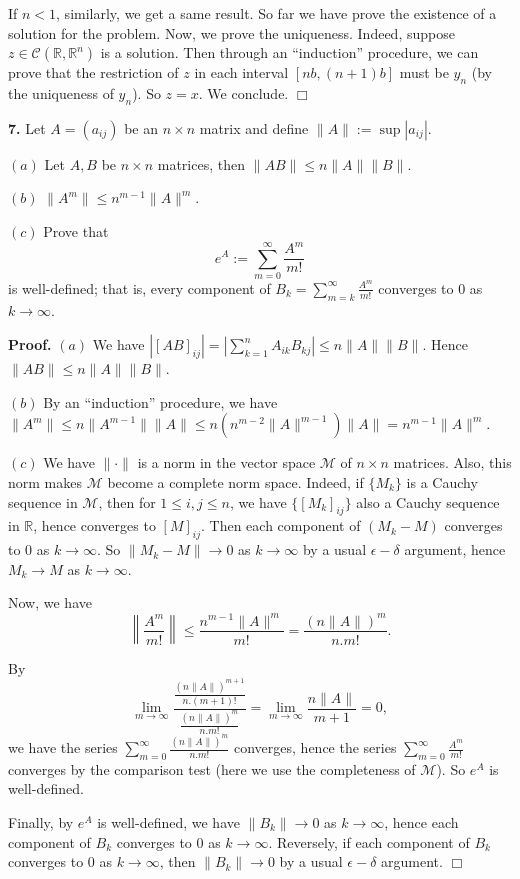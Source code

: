 \documentclass{article}
\begin{document}
If $n < 1$, similarly, we get a same result. So far we have prove the
existence of a solution for the problem. Now, we prove the uniqueness.
Indeed, suppose $z\in \mathcal{C}(\mathbb{R},\mathbb{R}^n)$ is a
solution. Then through an ``induction'' procedure, we can prove that the
restriction of $z$ in each interval $[nb,(n+1)b]$ must be $y_n$ (by the
uniqueness of $y_n$). So $z = x$. We conclude. $\Box$

    \textbf{7.} Let $A = (a_{ij})$ be an $n \times n$ matrix and define
$\|A\| := \sup |a_{ij} |$.

$(a)$ Let $A, B$ be $n \times n$ matrices, then
$\|AB \|≤ n\| A\| \|B\|$.

$(b)$ $\|A^m\| ≤ n^{m−1}\| A\|^m$.

$(c)$ Prove that \[e^{A} := \sum_{m=0}^{\infty}\frac{A^m}{m!}\] is
well-defined; that is, every component of
$B_k =\sum_{m=k}^{\infty}\frac{A^m}{m!}$ converges to $0$ as
$k \to \infty$.

    \textbf{Proof.} $(a)$ We have
$|[AB]_{ij}| = |\sum_{k=1}^n A_{ik}B_{kj}| \le n \|A\| \|B\|$. Hence
$\|AB \| \le n\|A\| \|B\|$.

$(b)$ By an ``induction'' procedure, we have
$\|A^m\| \le n \|A^{m-1}\| \|A\| \le n\left(n^{m-2} \|A\|^{m-1}\right)\|A\| = n^{m-1}\|A\|^m$.

$(c)$ We have $\|\cdot \|$ is a norm in the vector space $\mathcal{M}$
of $n\times n$ matrices. Also, this norm makes $\mathcal{M}$ become a
complete norm space. Indeed, if $\{M_k\}$ is a Cauchy sequence in
$\mathcal{M}$, then for $1\le i,j\le n$, we have $\{[M_k]_{ij}\}$ also a
Cauchy sequence in $\mathbb{R}$, hence converges to $[M]_{ij}$. Then
each component of $(M_k - M)$ converges to $0$ as $k \to \infty$. So
$\| M_k - M\| \to 0$ as $k\to \infty$ by a usual $\epsilon-\delta$
argument, hence $M_k \to M$ as $k \to \infty$.

Now, we have
\[\left\|\frac{A^m}{m!}\right\| \le  \frac{n^{m-1} \|A\|^m}{m!}= \frac{(n\|A\|)^m}{n.m!}.\]

By
\[\lim_{m\to \infty} \frac{\frac{(n\|A\|)^{m+1}}{n.(m+1)!}}{\frac{(n\|A\|)^m}{n.m!}} = \lim_{m\to\infty} \frac{n\|A\|}{m+1} = 0,\]
we have the series $\sum_{m=0}^{\infty}\frac{(n\|A\|)^m}{n.m!}$
converges, hence the series $\sum_{m=0}^{\infty}\frac{A^m}{m!}$
converges by the comparison test (here we use the completeness of
$\mathcal{M}$). So $e^A$ is well-defined.

Finally, by $e^A$ is well-defined, we have $\|B_k\| \to 0$ as
$k \to \infty$, hence each component of $B_k$ converges to $0$ as
$k \to \infty$. Reversely, if each component of $B_k$ converges to $0$
as $k \to \infty$, then $\|B_k\| \to 0$ by a usual $\epsilon-\delta$
argument. $\Box$
\end{document}

